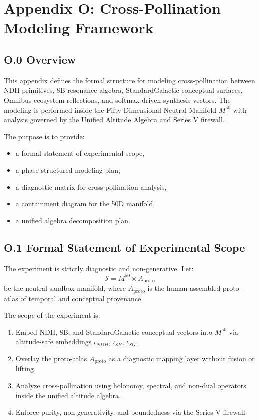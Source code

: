 \section*{Appendix O: Cross-Pollination Modeling Framework}
\subsection*{O.0 Overview}

This appendix defines the formal structure for modeling cross-pollination
between NDH primitives, 8B resonance algebra, StandardGalactic conceptual
surfaces, Omnibus ecosystem reflections, and softmax-driven synthesis
vectors. The modeling is performed inside the Fifty-Dimensional Neutral
Manifold $M^{50}$ with analysis governed by the Unified Altitude Algebra
and Series V firewall.

The purpose is to provide:
\begin{itemize}
    \item a formal statement of experimental scope,
    \item a phase-structured modeling plan,
    \item a diagnostic matrix for cross-pollination analysis,
    \item a containment diagram for the 50D manifold,
    \item a unified algebra decomposition plan.
\end{itemize}

\subsection*{O.1 Formal Statement of Experimental Scope}

The experiment is strictly diagnostic and non-generative. Let:
\[
\mathcal{S} = M^{50} \times A_{\mathrm{proto}}
\]
be the neutral sandbox manifold, where $A_{\mathrm{proto}}$ is the
human-assembled proto-atlas of temporal and conceptual provenance.

The scope of the experiment is:
\begin{enumerate}
    \item Embed NDH, 8B, and StandardGalactic conceptual vectors into
    $M^{50}$ via altitude-safe embeddings $\iota_{NDH}$, $\iota_{8B}$,
    $\iota_{SG}$.
    \item Overlay the proto-atlas $A_{\mathrm{proto}}$ as a diagnostic
    mapping layer without fusion or lifting.
    \item Analyze cross-pollination using holonomy, spectral, and
    non-dual operators inside the unified altitude algebra.
    \item Enforce purity, non-generativity, and boundedness via the
    Series V firewall.
\end{enumerate}

